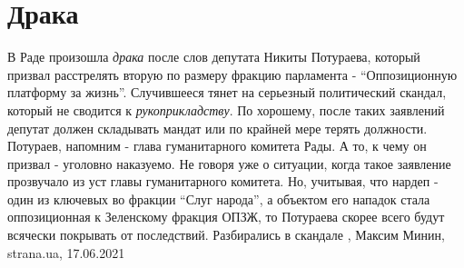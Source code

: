  
 
 
 
 
\chapter{Драка}

В Раде произошла \emph{драка} после слов депутата Никиты Потураева, который призвал
расстрелять вторую по размеру фракцию парламента - \enquote{Оппозиционную
платформу за жизнь}.  Случившееся тянет на серьезный политический скандал,
который не сводится к \emph{рукоприкладству}.  По хорошему, после таких заявлений
депутат должен складывать мандат или по крайней мере терять должности.
Потураев, напомним - глава гуманитарного комитета Рады. А то, к чему он призвал
- уголовно наказуемо. Не говоря уже о ситуации, когда такое заявление
прозвучало из уст главы гуманитарного комитета.  Но, учитывая, что нардеп -
один из ключевых во фракции \enquote{Слуг народа}, а объектом его нападок стала
оппозиционная к Зеленскому фракция ОПЗЖ, то Потураева скорее всего будут
всячески покрывать от последствий.  Разбирались в скандале
, 
Максим Минин, strana.ua, 17.06.2021

